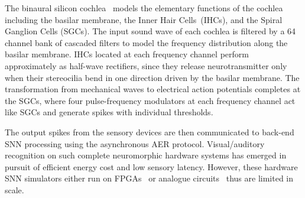 The binaural silicon cochlea~\citep{5537164} models the elementary functions of the cochlea including the basilar membrane, the Inner Hair Cells~(IHCs), and the Spiral Ganglion Cells (SGCs).
The input sound wave of each cochlea is filtered by a 64 channel bank of cascaded filters to model the frequency distribution along the basilar membrane.
IHCs located at each frequency channel perform approximately as half-wave rectifiers, since they release neurotransmitter only when their stereocilia bend in one direction driven by the basilar membrane.
The transformation from mechanical waves to electrical action potentials completes at the SGCs, where four pulse-frequency modulators at each frequency channel act like SGCs and generate spikes with individual thresholds.


The output spikes from the sensory devices are then communicated to back-end SNN processing using the asynchronous AER protocol.
Visual/auditory recognition on such complete neuromorphic hardware systems has emerged in pursuit of efficient energy cost and low sensory latency.
However, these hardware SNN simulators either run on FPGAs~\citep{neil2014minitaur, kiselev2016event} or analogue circuits~\citep{qiao2015reconfigurable} thus are limited in scale.

